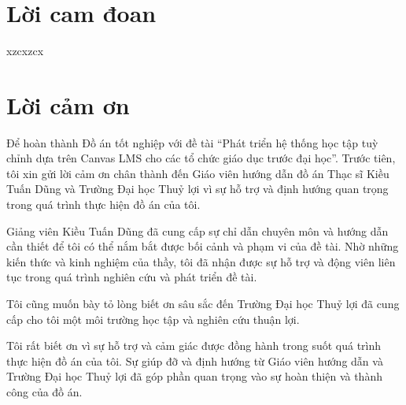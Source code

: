 \documentclass[a4paper,12pt,oneside]{report}
\title{\bf \TITLE}
\author{\AUTHOR}
\theoremstyle{definition}
\begin{document}
\restoregeometry


\chapter*{Lời cam đoan}

xzcxzcx
\newpage

\chapter*{Lời cảm ơn}

Để hoàn thành Đồ án tốt nghiệp với đề tài “Phát triển hệ thống học tập tuỳ chỉnh dựa trên Canvas LMS cho các tổ chức giáo dục trước đại học”. Trước tiên, tôi xin gửi lời cảm ơn chân thành đến Giáo viên hướng dẫn đồ án Thạc sĩ Kiều Tuấn Dũng và Trường Đại học Thuỷ lợi vì sự hỗ trợ và định hướng quan trọng trong quá trình thực hiện đồ án của tôi.

Giảng viên Kiều Tuấn Dũng đã cung cấp sự chỉ dẫn chuyên môn và hướng dẫn cần thiết để tôi có thể nắm bắt được bối cảnh và phạm vi của đề tài. Nhờ những kiến thức và kinh nghiệm của thầy, tôi đã nhận được sự hỗ trợ và động viên liên tục trong quá trình nghiên cứu và phát triển đề tài.

Tôi cũng muốn bày tỏ lòng biết ơn sâu sắc đến Trường Đại học Thuỷ lợi đã cung cấp cho tôi một môi trường học tập và nghiên cứu thuận lợi.

Tôi rất biết ơn vì sự hỗ trợ và cảm giác được đồng hành trong suốt quá trình thực hiện đồ án của tôi. Sự giúp đỡ và định hướng từ Giáo viên hướng dẫn và Trường Đại học Thuỷ lợi đã góp phần quan trọng vào sự hoàn thiện và thành công của đồ án.

\pagestyle{empty} %
\newpage
\tableofcontents %

\listoffigures %

\glsaddall

\newpage
{}

\newpage
\pagestyle{fancy} %
\end{document}
